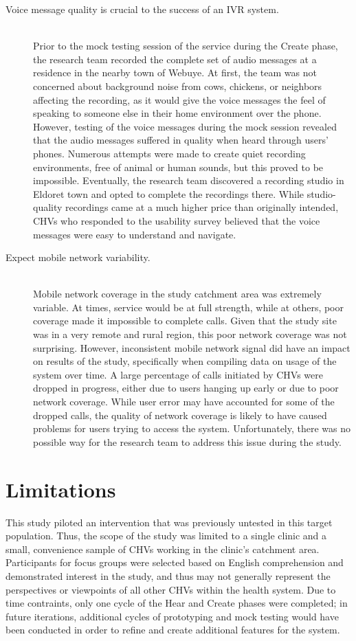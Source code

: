 \begin{description}
	\item[Voice message quality is crucial to the success of an IVR system.] \hfill \\
	Prior to the mock testing session of the service during the Create phase, the research team recorded the complete set of audio messages at a residence in the nearby town of Webuye. At first, the team was not concerned about background noise from cows, chickens, or neighbors affecting the recording, as it would give the voice messages the feel of speaking to someone else in their home environment over the phone. However, testing of the voice messages during the mock session revealed that the audio messages suffered in quality when heard through users' phones. Numerous attempts were made to create quiet recording environments, free of animal or human sounds, but this proved to be impossible. Eventually, the research team discovered a recording studio in Eldoret town and opted to complete the recordings there. While studio-quality recordings came at a much higher price than originally intended, CHVs who responded to the usability survey believed that the voice messages were easy to understand and navigate. 

	\item[Expect mobile network variability.] \hfill \\
	Mobile network coverage in the study catchment area was extremely variable. At times, service would be at full strength, while at others, poor coverage made it impossible to complete calls. Given that the study site was in a very remote and rural region, this poor network coverage was not surprising. However, inconsistent mobile network signal did have an impact on results of the study, specifically when compiling data on usage of the system over time. A large percentage of calls initiated by CHVs were dropped in progress, either due to users hanging up early or due to poor network coverage. While user error may have accounted for some of the dropped calls, the quality of network coverage is likely to have caused problems for users trying to access the system. Unfortunately, there was no possible way for the research team to address this issue during the study.
\end{description}


\section{Limitations}
This study piloted an intervention that was previously untested in this target population. Thus, the scope of the study was limited to a single clinic and a small, convenience sample of CHVs working in the clinic's catchment area. Participants for focus groups were selected based on English comprehension and demonstrated interest in the study, and thus may not generally represent the perspectives or viewpoints of all other CHVs within the health system. Due to time contraints, only one cycle of the Hear and Create phases were completed; in future iterations, additional cycles of prototyping and mock testing would have been conducted in order to refine and create additional features for the system.  

